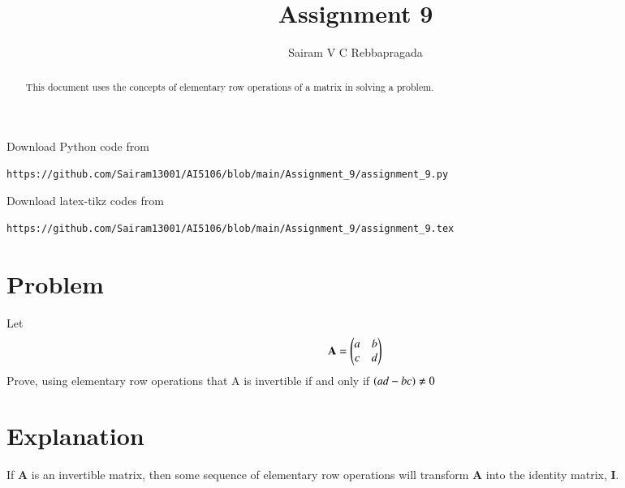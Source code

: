\documentclass[journal,12pt,twocolumn]{IEEEtran}
\begin{document}
\makeatletter
{}
\makeatother
\let\StandardTheFigure\thefigure
\let\vec\mathbf
\renewcommand{\thefigure}{\theproblem}
\def\putbox#1#2#3{\makebox[0in][l]{\makebox[#1][l]{}\raisebox{\baselineskip}[0in][0in]{\raisebox{#2}[0in][0in]{#3}}}}
     \def\rightbox#1{\makebox[0in][r]{#1}}
     \def\centbox#1{\makebox[0in]{#1}}
     \def\topbox#1{\raisebox{-\baselineskip}[0in][0in]{#1}}
     \def\midbox#1{\raisebox{-0.5\baselineskip}[0in][0in]{#1}}
\vspace{3cm}
\title{Assignment 9}
\author{Sairam V C Rebbapragada}
\maketitle
\newpage
\bigskip
\renewcommand{\thefigure}{\theenumi}
\renewcommand{\thetable}{\theenumi}
\begin{abstract}
This document uses the concepts of elementary row operations of a matrix in solving a problem.
\end{abstract}
Download Python code from 
%
\begin{lstlisting}
https://github.com/Sairam13001/AI5106/blob/main/Assignment_9/assignment_9.py
\end{lstlisting}
%
Download latex-tikz codes from 
%
\begin{lstlisting}
https://github.com/Sairam13001/AI5106/blob/main/Assignment_9/assignment_9.tex
\end{lstlisting}
%

\section{Problem}

Let
\begin{align}
    \vec{A} = \myvec{a & b \\c & d}  \label{given_matrix}
\end{align}
Prove, using elementary row operations that A is invertible if and only if $\left(ad - bc\right) \neq 0$ 

\section{Explanation}
If $\vec{A}$ is an invertible matrix, then some sequence of elementary row operations will transform $\vec{A}$ into the identity matrix, $\vec{I}$. 
\end{document}
